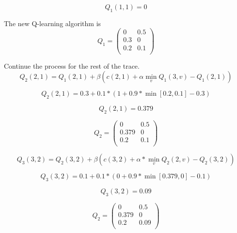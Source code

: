 \documentclass{article}
\begin{document}
\begin{equation}
    Q_{1}(1,1) = 0
\end{equation}

The new Q-learning algorithm is 
\begin{equation}
    Q_1 = \begin{pmatrix}
        0 & 0.5 \\
        0.3 & 0 \\
        0.2 & 0.1 \\
    \end{pmatrix}
\end{equation}

Continue the process for the rest of the trace.\\
\begin{equation}
    Q_{2}(2,1) = Q_1(2,1) + \beta (c(2,1) + \alpha \min_{v} Q_1(3,v) - Q_{1}(2,1))
\end{equation}

\begin{equation}
    Q_{2}(2,1) = 0.3 + 0.1 * (1 + 0.9 * \min [0.2, 0.1] - 0.3)
\end{equation}

\begin{equation}
    Q_{2}(2,1) = 0.379
\end{equation}

\begin{equation}
    Q_2 = \begin{pmatrix}
        0 & 0.5 \\
        0.379 & 0 \\
        0.2 & 0.1 \\
    \end{pmatrix}
\end{equation}

\begin{equation}
    Q_{3}(3,2) = Q_2(3,2) + \beta (c(3,2) + \alpha * \min_{v} Q_2(2,v) - Q_{2}(3,2))
\end{equation}

\begin{equation}
    Q_{3}(3,2) = 0.1 + 0.1 * (0 + 0.9 * \min [0.379, 0] - 0.1)
\end{equation}

\begin{equation}
    Q_{3}(3,2) = 0.09
\end{equation}

\begin{equation}
    Q_2 = \begin{pmatrix}
        0 & 0.5 \\
        0.379 & 0 \\
        0.2 & 0.09 \\
    \end{pmatrix}
\end{equation}
\end{document}
